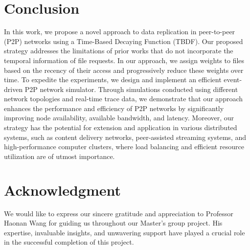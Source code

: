 \documentclass[10pt, conference]{IEEEtran}
\begin{document}
\section{Conclusion}\label{sec:conclusion}

In this work, we propose a novel approach to data replication in peer-to-peer (P2P) networks using a Time-Based Decaying Function (TBDF). Our proposed strategy addresses the limitations of prior works that do not incorporate the temporal information of file requests. In our approach, we assign weights to files based on the recency of their access and progressively reduce these weights over time. To expedite the experiments, we design and implement an efficient event-driven P2P network simulator. Through simulations conducted using different network topologies and real-time trace data, we demonstrate that our approach enhances the performance and efficiency of P2P networks by significantly improving node availability, available bandwidth, and latency. Moreover, our strategy has the potential for extension and application in various distributed systems, such as content delivery networks, peer-assisted streaming systems, and high-performance computer clusters, where load balancing and efficient resource utilization are of utmost importance.



\section{Acknowledgment}\label{sec:related}
We would like to express our sincere gratitude and appreciation to Professor Haonan Wang for guiding us throughout our Master's group project. His expertise, invaluable insights, and unwavering support have played a crucial role in the successful completion of this project.


\end{document}
